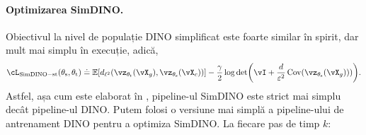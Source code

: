 \documentclass[../../book-main_ro.tex]{subfiles}
\begin{document}
\paragraph{Optimizarea SimDINO.} Obiectivul la nivel de populație DINO simplificat este foarte similar în spirit, dar mult mai simplu în execuție, adică,
\begin{equation}\label{eq:simdino_loss_teacherstudent}
    \cL_{\simdino-\student\teacher}(\theta_{\student}, \theta_{\teacher}) \doteq
    \Ex\rs{d_{\ell^{2}}(\vz_{\theta_{\teacher}}(\vX_{g}),
    \vz_{\theta_{\student}}(\vX_{c}))} - \frac{\gamma}{2}\log\det\rp{\vI + \frac{d}{\eps^{2}}\Cov(\vz_{\theta_{\student}}(\vX_{g})))}.
\end{equation}
Astfel, așa cum este elaborat în , pipeline-ul SimDINO este strict mai simplu decât pipeline-ul DINO. Putem folosi o versiune mai simplă a pipeline-ului de antrenament DINO pentru a optimiza SimDINO. La fiecare pas de timp \(k\):
\end{document}

